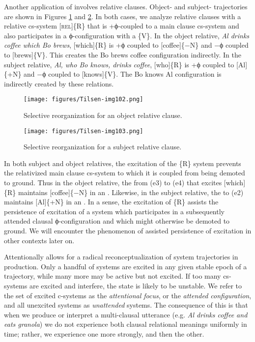   Another application of  involves relative clauses. Ob\-ject- and subject- trajectories are shown in Figures {\ref{fig:4:52}} and {\ref{fig:4:53}}. In both cases, we analyze relative clauses with a relative cs-system [\textsc{rel}]\{R\} that is +ϕ-coupled to a main clause cs-system and also participates in a ϕ-con\-fig\-u\-ra\-tion with a  \{V\}. In the object relative, \textit{Al drinks coffee which Bo brews}, [which]\{R\} is +ϕ coupled to [coffee]\{−N\} and −ϕ coupled to [brews]\{V\}. This creates the {\textbar}Bo brews coffee{\textbar} configuration indirectly. In the subject relative, \textit{Al, who Bo knows, drinks coffee}, [who]\{R\} is +ϕ coupled to [Al]\{+N\} and −ϕ coupled to [knows]\{V\}. The {\textbar}Bo knows Al{\textbar} configuration is indirectly created by these relations.

  
\begin{figure}
\texttt{[image: figures/Tilsen-img102.png]}
\caption{Selective reorganization for an object relative clause.}
\label{fig:4:52}
\end{figure}
 

  
\begin{figure}
\texttt{[image: figures/Tilsen-img103.png]}
\caption{Selective reorganization for a subject relative clause.}
\label{fig:4:53}
\end{figure}
 

  In both subject and object relatives, the excitation of the \{R\} system prevents the relativized main clause cs-system to which it is coupled from being demoted to ground. Thus in the object relative, the  from (e3) to (e4) that excites [which]\{R\} maintains [coffee]\{−N\} in an . Likewise, in the subject relative, the  to (e2) maintains [Al]\{+N\} in an . In a sense, the excitation of \{R\} assists the persistence of excitation of a system which participates in a subsequently attended clausal ϕ-con\-fig\-u\-ra\-tion and which might otherwise be demoted to ground. We will encounter the phenomenon of assisted persistence of excitation in other contexts later on.

Attentionally  allows for a radical reconceptualization of system trajectories in production.  Only a handful of systems are excited in any given stable epoch of a trajectory, while many more may be active but not excited. If too many cs-systems are excited and interfere, the state is likely to be unstable. We refer to the set of excited c-systems as the \textit{attentional focus}, or the \textit{attended configuration}, and all unexcited systems as \textit{unattended} systems. The consequence of this is that when we produce or interpret a multi-clausal utterance (e.g. \textit{Al drinks coffee and eats granola}) we do not experience both clausal relational meanings uniformly in time; rather, we experience one  more strongly, and then the other.

